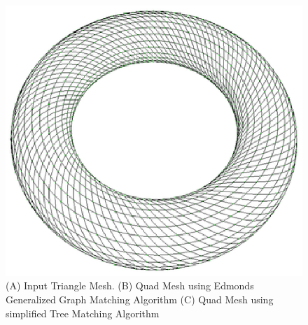 \documentclass[11pt, a4paper]{paper}
\begin{document}
{\begin{figure}
\includegraphics[scale=0.33]{torus3.eps}
\caption { (A) Input Triangle Mesh. (B) Quad Mesh using Edmonds Generalized
Graph Matching Algorithm (C) Quad Mesh using simplified Tree Matching Algorithm }
\end{figure}

}
\end{document}
